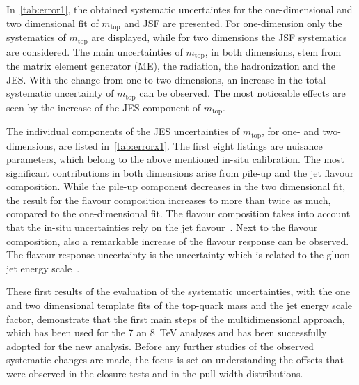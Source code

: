  In~\cref{tab:error1}, the obtained systematic uncertaintes for the one-dimensional and two dimensional fit of $m_{\text{top}}$ and JSF are presented.  For one-dimension only the systematics of $m_{\text{top}}$ are displayed, while for two dimensions the JSF systematics are considered. The main uncertainties of $m_{\text{top}}$, in both dimensions, stem from the matrix element generator (ME), the radiation, the hadronization and the JES.  With the change from one to two dimensions, an increase in the  total systematic uncertainty of $m_{\text{top}}$ can be observed. The most noticeable effects are seen by the increase of the JES component of $m_{\text{top}}$.

 The individual components of the JES uncertainties of $m_{\text{top}}$, for one- and two-dimensions, are listed in~\cref{tab:errorx1}. The first eight listings are nuisance parameters, which belong to the above mentioned in-situ calibration. The most significant contributions in both dimensions arise from pile-up and the jet flavour composition. While  the pile-up component decreases in the two dimensional fit, the result for the flavour composition increases to more than twice as much, compared to the one-dimensional fit.  The flavour composition takes into account  that the  in-situ uncertainties rely on the jet flavour~\cite{ATL-PHYS-PUB-2015-015}. Next to the flavour composition, also a remarkable increase of the flavour response can be observed. The flavour response uncertainty is the uncertainty which is related to the gluon jet energy scale~\cite{ATL-PHYS-PUB-2015-015}.  

 These first results of the evaluation of the systematic uncertainties, with the one and two dimensional template fits of the top-quark mass and the jet energy scale factor, demonstrate  that the  first main steps of the multidimensional approach, which has been used for the 7 an 8~TeV analyses and has been successfully adopted for the new analysis.  Before any further studies of the observed systematic changes are made, the 
focus is set on understanding the offsets that were observed in the closure tests and in the pull width distributions.



